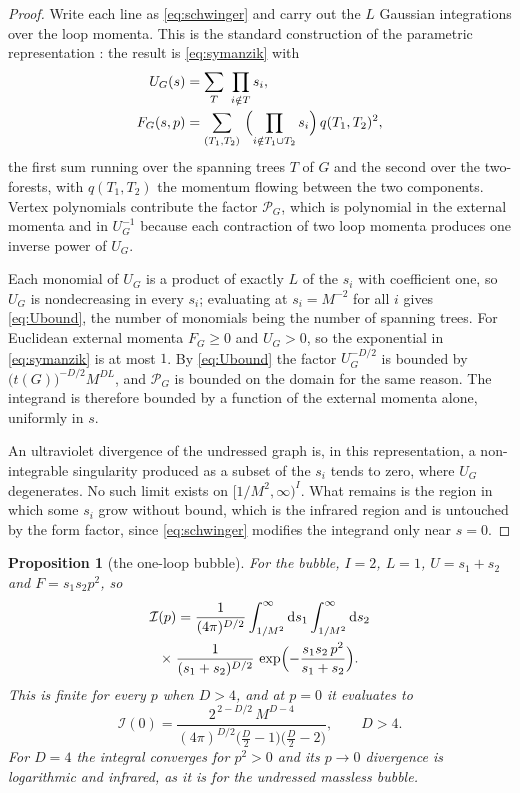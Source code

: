 \documentclass[aps,prd,10pt,twocolumn,superscriptaddress,nofootinbib,floatfix,longbibliography,showpacs,showkeys]{revtex4-2}
\theoremstyle{plain}
\newtheorem{proposition}{Proposition}
\theoremstyle{definition}
\theoremstyle{remark}
\newcommand{\dd}{\mathrm{d}}
\begin{document}
\begin{proof}
Write each line as \eqref{eq:schwinger} and carry out the $L$ Gaussian integrations over the loop momenta. This is the standard construction of the parametric representation \cite[Chapter~6]{Smirnov2006}: the result is \eqref{eq:symanzik} with
\begin{align*}
U_G(s)&=\sum_{T}\ \prod_{i\notin T}s_i,\\
F_G(s,p)&=\sum_{(T_1,T_2)}\ \Bigl(\prod_{i\notin T_1\cup T_2}s_i\Bigr)\,q(T_1,T_2)^2,
\end{align*}
the first sum running over the spanning trees $T$ of $G$ and the second over the two-forests, with $q(T_1,T_2)$ the momentum flowing between the two components. Vertex polynomials contribute the factor $\mathcal P_G$, which is polynomial in the external momenta and in $U_G^{-1}$ because each contraction of two loop momenta produces one inverse power of $U_G$.

Each monomial of $U_G$ is a product of exactly $L$ of the $s_i$ with coefficient one, so $U_G$ is nondecreasing in every $s_i$; evaluating at $s_i=M^{-2}$ for all $i$ gives \eqref{eq:Ubound}, the number of monomials being the number of spanning trees. For Euclidean external momenta $F_G\ge0$ and $U_G>0$, so the exponential in \eqref{eq:symanzik} is at most $1$. By \eqref{eq:Ubound} the factor $U_G^{-D/2}$ is bounded by $\bigl(t(G)\bigr)^{-D/2}M^{DL}$, and $\mathcal P_G$ is bounded on the domain for the same reason. The integrand is therefore bounded by a function of the external momenta alone, uniformly in $s$.

An ultraviolet divergence of the undressed graph is, in this representation, a non-integrable singularity produced as a subset of the $s_i$ tends to zero, where $U_G$ degenerates. No such limit exists on $[1/M^2,\infty)^I$. What remains is the region in which some $s_i$ grow without bound, which is the infrared region and is untouched by the form factor, since \eqref{eq:schwinger} modifies the integrand only near $s=0$.
\end{proof}

\begin{proposition}[the one-loop bubble]
\label{prop:bubble}
For the bubble, $I=2$, $L=1$, $U=s_1+s_2$ and $F=s_1s_2p^2$, so
\begin{multline}
\label{eq:bubble}
\mathcal I(p)=\frac{1}{(4\pi)^{D/2}}\int_{1/M^2}^{\infty}\dd s_1\int_{1/M^2}^{\infty}\dd s_2\\
\times\;\frac{1}{(s_1+s_2)^{D/2}}\,\exp\Bigl(-\frac{s_1s_2\,p^2}{s_1+s_2}\Bigr).
\end{multline}
This is finite for every $p$ when $D>4$, and at $p=0$ it evaluates to
\begin{equation}
\label{eq:bubble0}
\mathcal I(0)=\frac{2^{\,2-D/2}\,M^{D-4}}{(4\pi)^{D/2}\bigl(\tfrac D2-1\bigr)\bigl(\tfrac D2-2\bigr)} ,
\qquad D>4 .
\end{equation}
For $D=4$ the integral converges for $p^2>0$ and its $p\to0$ divergence is logarithmic and infrared, as it is for the undressed massless bubble.
\end{proposition}
\end{document}
